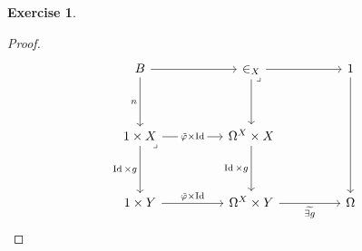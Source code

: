 \documentclass{article}
\DeclareMathOperator{\Id}{Id}
\theoremstyle{definition}
\newtheorem{question}{Exercise}
\begin{document}
\begin{question}
\begin{enumerate}[a)]
\begin{proof}
                  \begin{equation}
                      \begin{tikzcd}[ampersand replacement=\&]
                          B \&\& {\in_{X}} \&\& 1 \\
                          \\
                          {1\times X} \&\& {\Omega^{X}\times X} \\
                          \\
                          {1\times Y} \&\& {\Omega^{X}\times Y} \&\& \Omega
                          \arrow[from=1-3, to=1-5]
                          \arrow[from=1-5, to=5-5]
                          \arrow["{\widetilde{\exists g}}"', from=5-3, to=5-5]
                          \arrow[from=1-3, to=3-3]
                          \arrow["{\Id\times g}"', from=3-3, to=5-3]
                          \arrow["\lrcorner"{anchor=center, pos=0}, draw=none, from=1-3, to=5-5]
                          \arrow["n"', from=1-1, to=3-1]
                          \arrow["{\Id\times g}"', from=3-1, to=5-1]
                          \arrow["{\tilde{\varphi}\times\Id}", from=5-1, to=5-3]
                          \arrow["\tilde{\varphi}\times\Id"{description}, from=3-1, to=3-3]
                          \arrow["\lrcorner"{anchor=center, pos=0}, draw=none, from=3-1, to=5-3]
                          \arrow[from=1-1, to=1-3]
                      \end{tikzcd}
                      \label{fig:pullback}
                  \end{equation}


\end{proof}
\end{enumerate}
\end{question}
\end{document}
